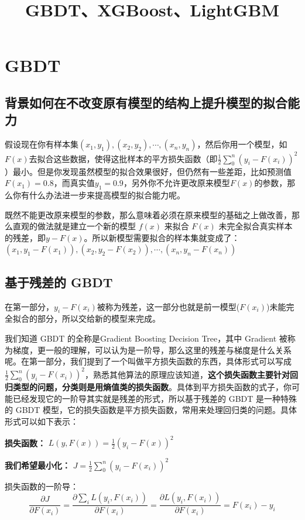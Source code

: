 \documentclass[12pt]{article}
\title{GBDT、XGBoost、LightGBM\cite{Zhihu_Understanding_GBDT}\cite{Zhihu_Understanding_GBDT_2}}
\begin{document}
\maketitle
\tableofcontents

\section{GBDT}
\subsection{背景如何在不改变原有模型的结构上提升模型的拟合能力}

假设现在你有样本集$(x_1,y_1),(x_2,y_2),\cdots,(x_n,y_n)$，然后你用一个模型，如$F(x)$去拟合这些数据，使得这批样本的平方损失函数（即$\frac{1}{2}\sum_0^n(y_i-F(x_i))^2$）最小。但是你发现虽然模型的拟合效果很好，但仍然有一些差距，比如预测值 $F(x_1)=0.8$，而真实值$y_1=0.9$，另外你不允许更改原来模型$F(x)$的参数，那么你有什么办法进一步来提高模型的拟合能力呢。

既然不能更改原来模型的参数，那么意味着必须在原来模型的基础之上做改善，那么直观的做法就是建立一个新的模型 $f(x)$ 来拟合 $F(x)$ 未完全拟合真实样本的残差，即$y-F(x)$。所以新模型需要拟合的样本集就变成了：$(x_1,y_1-F(x_1)),(x_2,y_2-F(x_2)),\cdots,(x_n,y_n-F(x_n))$

\subsection{基于残差的 GBDT}
在第一部分，$y_i-F(x_i)$被称为残差，这一部分也就是前一模型($F(x_i)$)未能完全拟合的部分，所以交给新的模型来完成。

我们知道 GBDT 的全称是Gradient Boosting Decision Tree，其中 Gradient 被称为梯度，更一般的理解，可以认为是一阶导，那么这里的残差与梯度是什么关系呢。在第一部分，我们提到了一个叫做平方损失函数的东西，具体形式可以写成$\frac{1}{2}\sum_0^n(y_i-F(x_i))^2$，熟悉其他算法的原理应该知道，\textbf{这个损失函数主要针对回归类型的问题，分类则是用熵值类的损失函数}。具体到平方损失函数的式子，你可能已经发现它的一阶导其实就是残差的形式，所以基于残差的 GBDT 是一种特殊的 GBDT 模型，它的损失函数是平方损失函数，常用来处理回归类的问题。具体形式可以如下表示：

\textbf{损失函数：} $L(y,F(x)) =\frac{1}{2}(y_i-F(x))^2 $

\textbf{我们希望最小化：} $J=\frac{1}{2}\sum_0^n(y_i-F(x_i))^2$

损失函数的一阶导：
$$\frac{\partial J}{\partial F(x_i)} = \frac{\partial \sum_iL(y_i,F(x_i))}{\partial F(x_i)}=\frac{\partial L(y_i,F(x_i))}{\partial F(x_i)} = F(x_i)-y_i$$
\end{document}
